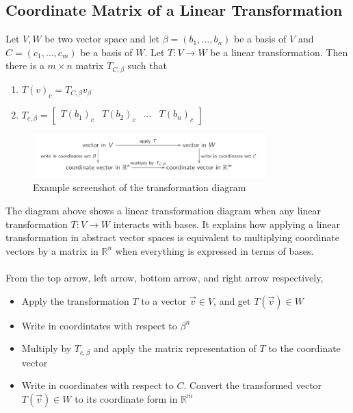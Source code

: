 \begin{enumerate}
\section{Coordinate Matrix of a Linear Transformation}
Let $V, W$ be two vector space and let $\beta = (b_1, \dots, b_n)$ 
be a basis of $V$ and $C = (c_1, \dots, c_m)$ be a basis of $W$. 
Let $T : V \rightarrow W$ be a linear transformation. Then there is a $m 
\times n$ matrix $T_{C, \beta}$ such that 
\begin{enumerate}
  \item $T(v)_c = T_{C,\beta}v_\beta$
  \item $T_{c, \beta} = \begin{bmatrix} T(b_1)_c & T(b_2)_c & \dots & 
    T(b_n)_c \end{bmatrix}$
\end{enumerate}
\begin{figure}[h]
    \centering
    \includegraphics[width=0.8\textwidth]{lin-transformations.png}
    \caption{Example screenshot of the transformation diagram}
    \label{fig:transformation-diagram}
\end{figure}
The diagram above shows a linear transformation diagram when any linear 
transformation $T : V \rightarrow W$ interacts with bases. It explains 
how applying a linear transformation in abstract vector spaces is 
equivalent to multiplying coordinate vectors by a matrix in 
$\mathbb{R}^n$ when everything is expressed in terms of bases. \\\\ 
From the top arrow, left arrow, bottom arrow, and right arrow 
respectively,
\begin{itemize}
  \item Apply the transformation $T$ to a vector $\vec{v} \in V$, and 
    get $T(\vec{v}) \in W$
  \item Write in coordintates with respect to $\beta^n$
  \item Multiply by $T_{c, \beta}$ and apply the matrix representation 
    of $T$ to the coordinate vector 
  \item Write in coordinates with respect to $C$. Convert the 
    transformed vector $T(\vec{v}) \in W$ to its coordinate form in 
    $\mathbb{R}^m$
\end{itemize}

\end{enumerate}
